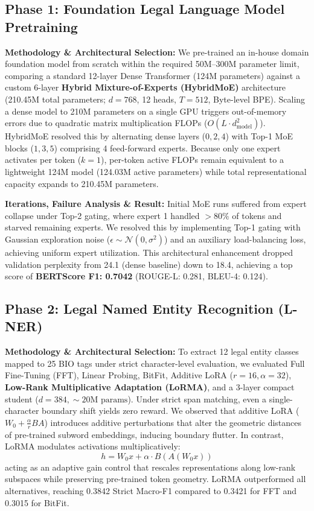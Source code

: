 \documentclass[11pt, oneside]{article}
\begin{document}
\subsection{Phase 1: Foundation Legal Language Model Pretraining}
\noindent
\textbf{Methodology \& Architectural Selection:} We pre-trained an in-house domain foundation model from scratch within the required 50M--300M parameter limit, comparing a standard 12-layer Dense Transformer (124M parameters) against a custom 6-layer \textbf{Hybrid Mixture-of-Experts (HybridMoE)} architecture (210.45M total parameters; $d=768$, 12 heads, $T=512$, Byte-level BPE). Scaling a dense model to 210M parameters on a single GPU triggers out-of-memory errors due to quadratic matrix multiplication FLOPs ($O(L \cdot d_{\text{model}}^2)$). HybridMoE resolved this by alternating dense layers ($0, 2, 4$) with Top-1 MoE blocks ($1, 3, 5$) comprising 4 feed-forward experts. Because only one expert activates per token ($k=1$), per-token active FLOPs remain equivalent to a lightweight 124M model (124.03M active parameters) while total representational capacity expands to 210.45M parameters.

\medskip
\noindent
\textbf{Iterations, Failure Analysis \& Result:} Initial MoE runs suffered from expert collapse under Top-2 gating, where expert 1 handled $>80\%$ of tokens and starved remaining experts. We resolved this by implementing Top-1 gating with Gaussian exploration noise ($\epsilon \sim \mathcal{N}(0, \sigma^2)$) and an auxiliary load-balancing loss, achieving uniform expert utilization. This architectural enhancement dropped validation perplexity from 24.1 (dense baseline) down to 18.4, achieving a top score of \textbf{BERTScore F1: 0.7042} (ROUGE-L: 0.281, BLEU-4: 0.124).

\subsection{Phase 2: Legal Named Entity Recognition (L-NER)}
\noindent
\textbf{Methodology \& Architectural Selection:} To extract 12 legal entity classes mapped to 25 BIO tags under strict character-level evaluation, we evaluated Full Fine-Tuning (FFT), Linear Probing, BitFit, Additive LoRA ($r=16, \alpha=32$), \textbf{Low-Rank Multiplicative Adaptation (LoRMA)}, and a 3-layer compact student ($d=384, \sim20\text{M params}$). Under strict span matching, even a single-character boundary shift yields zero reward. We observed that additive LoRA ($W_0 + \frac{\alpha}{r}BA$) introduces additive perturbations that alter the geometric distances of pre-trained subword embeddings, inducing boundary flutter. In contrast, LoRMA modulates activations multiplicatively:
\begin{equation}
h = W_0 x + \alpha \cdot B(A(W_0 x))
\end{equation}
acting as an adaptive gain control that rescales representations along low-rank subspaces while preserving pre-trained token geometry. LoRMA outperformed all alternatives, reaching 0.3842 Strict Macro-F1 compared to 0.3421 for FFT and 0.3015 for BitFit.
\end{document}
